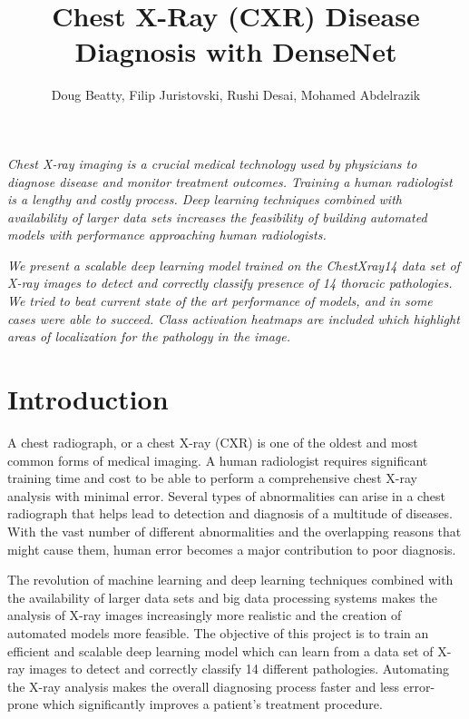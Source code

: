 \documentclass{amia}
\begin{document}
\title{Chest X-Ray (CXR) Disease Diagnosis with DenseNet}

\author{Doug Beatty, Filip Juristovski, Rushi Desai, Mohamed Abdelrazik}


\maketitle


\textit{Chest X-ray imaging \cite{ref1} is a crucial medical technology used by physicians to diagnose disease and monitor treatment outcomes. Training a human radiologist is a lengthy and costly process. Deep learning techniques combined with availability of larger data sets increases the feasibility of building automated models with performance approaching human radiologists.}

\textit{We present a scalable deep learning model trained on the ChestXray14 \cite{ref7} data set of X-ray images to detect and correctly classify presence of 14 thoracic pathologies. We tried to beat current state of the art performance of models, and in some cases were able to succeed. Class activation heatmaps are included which highlight areas of localization for the pathology in the image.}

\section*{Introduction}
A chest radiograph\cite{ref1}, or a chest X-ray (CXR) is one of the oldest and most common forms of medical imaging. A human radiologist requires significant training time and cost to be able to perform a comprehensive chest X-ray analysis with minimal error. Several types of abnormalities can arise in a chest radiograph that helps lead to detection and diagnosis of a multitude of diseases. With the vast number of different abnormalities and the overlapping reasons that might cause them, human error becomes a major contribution to poor diagnosis.

The revolution of machine learning and deep learning techniques combined with the availability of larger data sets\cite{ref2} and big data processing systems\cite{ref3} makes the analysis of X-ray images increasingly more realistic and the creation of automated models more feasible. The objective of this project is to train an efficient and scalable deep learning model which can learn from a data set of X-ray images to detect and correctly classify 14 different pathologies. Automating the X-ray analysis makes the overall diagnosing process faster and less error-prone which significantly improves a patient’s treatment procedure.
\end{document}
